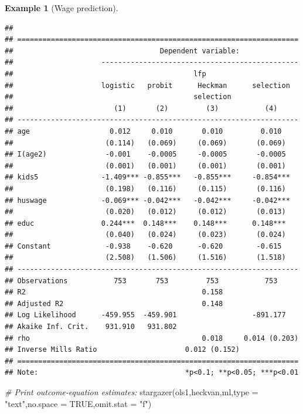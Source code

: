 \documentclass[
  12pt,
]{book}
\newenvironment{Shaded}{\begin{snugshade}}{\end{snugshade}}
\newcommand{\AttributeTok}[1]{\textcolor[rgb]{0.77,0.63,0.00}{#1}}
\newcommand{\CommentTok}[1]{\textcolor[rgb]{0.56,0.35,0.01}{\textit{#1}}}
\newcommand{\ConstantTok}[1]{\textcolor[rgb]{0.00,0.00,0.00}{#1}}
\newcommand{\FunctionTok}[1]{\textcolor[rgb]{0.00,0.00,0.00}{#1}}
\newcommand{\NormalTok}[1]{#1}
\newcommand{\StringTok}[1]{\textcolor[rgb]{0.31,0.60,0.02}{#1}}
\theoremstyle{definition}
\theoremstyle{definition}
\newtheorem{example}{Example}[chapter]
\theoremstyle{definition}
\theoremstyle{definition}
\theoremstyle{remark}
\begin{document}
\begin{example}[Wage prediction]
\begin{verbatim}
## 
## ===================================================================
##                                   Dependent variable:              
##                     -----------------------------------------------
##                                           lfp                      
##                     logistic   probit      Heckman      selection  
##                                           selection                
##                        (1)       (2)         (3)           (4)     
## -------------------------------------------------------------------
## age                   0.012     0.010       0.010         0.010    
##                      (0.114)   (0.069)     (0.069)       (0.069)   
## I(age2)              -0.001    -0.0005     -0.0005       -0.0005   
##                      (0.001)   (0.001)     (0.001)       (0.001)   
## kids5               -1.409*** -0.855***   -0.855***     -0.854***  
##                      (0.198)   (0.116)     (0.115)       (0.116)   
## huswage             -0.069*** -0.042***   -0.042***     -0.042***  
##                      (0.020)   (0.012)     (0.012)       (0.013)   
## educ                0.244***  0.148***    0.148***      0.148***   
##                      (0.040)   (0.024)     (0.023)       (0.024)   
## Constant             -0.938    -0.620      -0.620        -0.615    
##                      (2.508)   (1.506)     (1.516)       (1.518)   
## -------------------------------------------------------------------
## Observations           753       753         753           753     
## R2                                          0.158                  
## Adjusted R2                                 0.148                  
## Log Likelihood      -459.955  -459.901                  -891.177   
## Akaike Inf. Crit.    931.910   931.802                             
## rho                                         0.018     0.014 (0.203)
## Inverse Mills Ratio                     0.012 (0.152)              
## ===================================================================
## Note:                                   *p<0.1; **p<0.05; ***p<0.01
\end{verbatim}

\begin{Shaded}
\begin{Highlighting}[]
\CommentTok{\# Print outcome{-}equation estimates:}
\FunctionTok{stargazer}\NormalTok{(ols1,heckvan,ml,}\AttributeTok{type =} \StringTok{"text"}\NormalTok{,}\AttributeTok{no.space =} \ConstantTok{TRUE}\NormalTok{,}\AttributeTok{omit.stat =} \StringTok{"f"}\NormalTok{)}
\end{Highlighting}
\end{Shaded}


\end{example}
\end{document}
